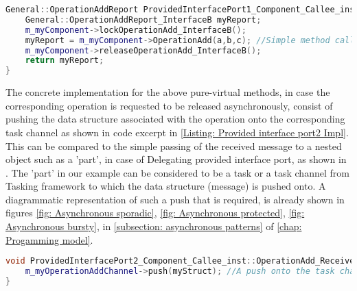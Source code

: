 \begin{Listing}
\begin{lstlisting}[language=C++]
General::OperationAddReport ProvidedInterfacePort1_Component_Callee_inst::OperationAdd (const IntegerType& a,const IntegerType& b,IntegerType& c) {
	General::OperationAddReport_InterfaceB myReport;
	m_myComponent->lockOperationAdd_InterfaceB();
	myReport = m_myComponent->OperationAdd(a,b,c); //Simple method call
	m_myComponent->releaseOperationAdd_InterfaceB();
	return myReport;
}
\end{lstlisting}
\caption{Code excerpt from the generated code for operation \texttt{OperationAdd} access in \texttt{Provided\allowbreak Interface\allowbreak Port1\_\allowbreak Component\_\allowbreak Callee\_\allowbreak inst} which is called synchronously and has \texttt{Protected} as a non-functional property attached to it}
\label{Listing: Provided interface port1 Impl}
\end{Listing}

The concrete implementation for the above pure-virtual methods, in case the corresponding operation is requested to be released asynchronously, consist of pushing the data structure associated with the operation onto the corresponding task channel as shown in code excerpt in \cref{Listing: Provided interface port2 Impl}. This can be compared to the simple passing of the received message to a nested object such as a 'part', in case of Delegating provided interface port, as shown in \cite{CBSEExample}. The 'part' in our example can be considered to be a task or a task channel from Tasking framework to which the data structure (message) is pushed onto. A diagrammatic representation of such a push that is required, is already shown in figures \cref{fig: Asynchronous sporadic}, \cref{fig: Asynchronous protected}, \cref{fig: Asynchronous bursty}, in \cref{subsection: asynchronous patterns} of \cref{chap: Progamming model}.

\begin{Listing}
\begin{lstlisting}[language=C++]
void ProvidedInterfacePort2_Component_Callee_inst::OperationAdd_Receiver (General::OperationAddStruct_InterfaceB myStruct) {
	m_myOperationAddChannel->push(myStruct); //A push onto the task channel
}
\end{lstlisting}
\caption{Code excerpt from the generated code for operation \texttt{OperationAdd} access in \texttt{Provided\allowbreak Interface\allowbreak Port2\_\allowbreak Component\_\allowbreak Callee\_\allowbreak inst} which is called asynchronously}
\label{Listing: Provided interface port2 Impl}
\end{Listing}

